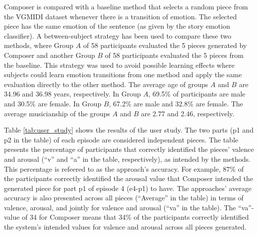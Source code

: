 Composer is compared with a baseline method that selects a random piece from the VGMIDI dataset whenever there is a transition of emotion. The selected piece has the same emotion of the sentence (as given by the story emotion classifier). A between-subject strategy has been used to compare these two methods, where Group $A$ of 58 participants evaluated the 5 pieces generated by Composer and another Group $B$ of 58 participants evaluated the 5 pieces from the baseline. This strategy was used to avoid possible learning effects where subjects could learn emotion transitions from one method and apply the same evaluation directly to the other method. The average age of groups $A$ and $B$ are 34.96 and 36.98 years, respectively. In Group $A$, 69.5\% of participants are male and 30.5\% are female. In Group $B$, 67.2\% are male and 32.8\% are female. The average musicianship of the groups $A$ and $B$ are 2.77 and 2.46, respectively.

Table \ref{tab:user_study} shows the results of the user study. The two parts (p1 and p2 in the table) of each episode are considered independent pieces. The table presents the percentage of participants that correctly identified the pieces' valence and arousal (``v'' and ``a'' in the table, respectively), as intended by the methods. This percentage is refeered to as the approach's accuracy. For example, 87\% of the participants correctly identified the arousal value that Composer intended the generated piece for part p1 of episode 4 (e4-p1) to have. The approaches' average accuracy is also presented across all pieces (``Average'' in the table) in terms of valence, arousal, and jointly for valence and arousal (``va'' in the table). The ``va''-value of 34 for Composer means that 34\% of the participants correctly identified the system's intended values for valence and arousal across all pieces generated.

